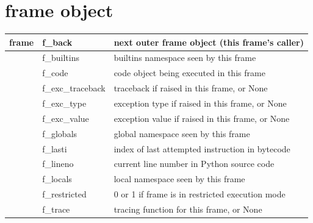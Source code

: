 \documentclass{icldt}
\numberwithin{equation}{section}       %
\begin{document}
{\section{frame object}
\begin{tabularx}{\textwidth}{ |l|l|X| }
    \hline
    frame & f_back & next outer frame object (this frame’s caller) \\
   	\hline
    & f_builtins & builtins namespace seen by this frame \\
   	\hline
	& f_code & code object being executed in this frame \\
   	\hline
	& f_exc_traceback & traceback if raised in this frame, or \textsf{None} \\
   	\hline
	& f_exc_type & exception type if raised in this frame, or \textsf{None} \\
   	\hline
	& f_exc_value & exception value if raised in this frame, or \textsf{None} \\
   	\hline
	& f_globals & global namespace seen by this frame \\
   	\hline
	& f_lasti & index of last attempted instruction in bytecode \\
   	\hline
	& f_lineno & current line number in Python source code \\
   	\hline
	& f_locals & local namespace seen by this frame \\
   	\hline
	& f_restricted & 0 or 1 if frame is in restricted execution mode \\
   	\hline
	& f_trace & tracing function for this frame, or \textsf{None} \\
   	\hline
\end{tabularx}

}
\end{document}
